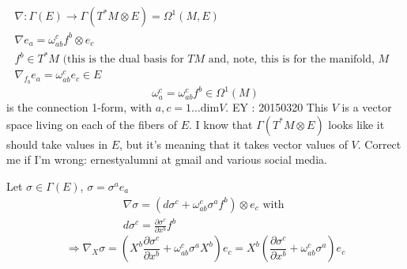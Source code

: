 \[
\begin{gathered}
  \nabla : \Gamma(E) \to \Gamma(T^*M \otimes E) = \Omega^1(M,E) \\
  \nabla e_a = \omega^c_{ab} f^b \otimes e_c \\ 
  f^b \in T^*M \text{ (this is the dual basis for $TM$ and, note, this is for the manifold, $M$ } \\
  \nabla_{f_b}e_a = \omega^c_{ab} e_c \in E
\end{gathered}
\]
\[
\omega^c_a  = \omega^c_{ab} f^b \in \Omega^1(M)
\]
is the connection 1-form, with $a,c = 1 \dots \text{dim}V$.  EY : 20150320 This $V$ is a vector space living on each of the fibers of $E$.   I know that $\Gamma(T^*M \otimes E)$ looks like it should take values in $E$, but it's meaning that it takes vector values of $V$.  Correct me if I'm wrong: ernestyalumni at gmail and various social media.

Let $\sigma \in \Gamma(E)$, $\sigma = \sigma^ae_a$  
\[
\begin{gathered}
  \nabla \sigma = (d\sigma^c + \omega^c_{ab} \sigma^a f^b) \otimes e_c \text{ with } \\ 
  d\sigma^c = \frac{ \partial \sigma^c}{ \partial x^b } f^b 
\end{gathered}
\]
\[
\Longrightarrow \nabla_X \sigma = \left( X^b \frac{ \partial \sigma^c}{ \partial x^b} + \omega^c_{ab} \sigma^a X^b \right)e_c = X^b \left( \frac{ \partial \sigma^c}{ \partial x^b } + \omega^c_{ab} \sigma^a \right)e_c
\]
